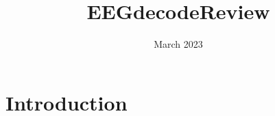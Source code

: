\documentclass{article}
\title{EEGdecodeReview}
\date{March 2023}
\begin{document}
\maketitle
\cite{pyriemann}

\section{Introduction}


\balance

\end{document}
